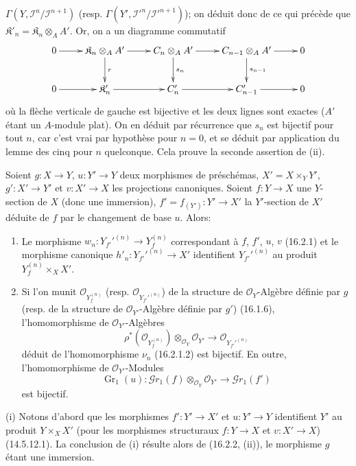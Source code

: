 $\Gamma(Y,\mathscr{I}^n/\mathscr{I}^{n+1})$ (resp.
$\Gamma(Y',\mathscr{I}'^n/\mathscr{I}'^{n+1})$); on déduit donc de ce qui
précède que $\mathfrak{K}'_n=\mathfrak{K}_n\otimes_A A'$. Or, on a un
diagramme commutatif
\[
  \xymatrix{
    0 \ar[r] &
    \mathfrak{K}_n\otimes_A A' \ar[r]\ar[d]^r &
    C_n\otimes_A A' \ar[r]\ar[d]^{s_n} &
    C_{n-1}\otimes_A A' \ar[r]\ar[d]^{s_{n-1}} & 0 \\
    0 \ar[r] &
    \mathfrak{K}'_n \ar[r] &
    C'_n \ar[r] &
    C'_{n-1} \ar[r] & 0
  }
\]
où la flèche verticale de gauche est bijective et les deux lignes sont exactes
($A'$ étant un $A$-module plat). On en déduit par récurrence que $s_n$ est
bijectif pour tout $n$, car c'est vrai par hypothèse pour $n=0$, et se déduit
par application du lemme des cinq pour $n$ quelconque. Cela prouve la seconde
assertion de (ii).

\begin{corollary}[16.2.3]
\label{IV.16.2.3}
Soient $g:X\to Y$, $u:Y'\to Y$ deux morphismes de préschémas,
$X'=X\times_Y Y'$, $g':X'\to Y'$ et $v:X'\to X$ les projections canoniques.
Soient $f:Y\to X$ une $Y$-section de $X$ (donc une immersion),
$f'=f_{(Y')}:Y'\to X'$ la $Y'$-section de $X'$ déduite de $f$ par le
changement de base $u$. Alors:
\begin{enumerate}
\item[(i)] Le morphisme
$w_n:Y_{f'}'^{(n)}\to Y_f^{(n)}$ correspondant à $f$, $f'$, $u$, $v$
(16.2.1) et le morphisme canonique
$h'_n:Y_{f'}'^{(n)}\to X'$ identifient $Y_{f'}'^{(n)}$ au produit
$Y_f^{(n)}\times_X X'$.
\item[(ii)] Si l'on munit $\mathcal{O}_{Y_f^{(n)}}$ (resp.
$\mathcal{O}_{Y_{f'}'^{(n)}}$) de la structure de $\mathcal{O}_Y$-Algèbre
définie par $g$ (resp. de la structure de $\mathcal{O}_{Y'}$-Algèbre définie
par $g'$) (16.1.6), l'homomorphisme de $\mathcal{O}_{Y'}$-Algèbres
\[
  \rho^*(\mathcal{O}_{Y_f^{(n)}})
  \otimes_{\mathcal{O}_Y}\mathcal{O}_{Y'}
  \longrightarrow
  \mathcal{O}_{Y_{f'}'^{(n)}}
  \tag{16.2.3.1}
  \label{IV.16.2.3.1}
\]
déduit de l'homomorphisme $\nu_n$ (16.2.1.2) est bijectif. En outre,
l'homomorphisme de $\mathcal{O}_{Y'}$-Modules
\[
  \operatorname{Gr}_1(u):
  \mathscr{G}r_1(f)\otimes_{\mathcal{O}_Y}\mathcal{O}_{Y'}
  \longrightarrow\mathscr{G}r_1(f')
  \tag{16.2.3.2}
  \label{IV.16.2.3.2}
\]
est bijectif.
\end{enumerate}
\end{corollary}

\noindent(i) Notons d'abord que les morphismes $f':Y'\to X'$ et $u:Y'\to Y$
identifient $Y'$ au produit $Y\times_X X'$ (pour les morphismes structuraux
$f:Y\to X$ et $v:X'\to X$) (14.5.12.1). La conclusion de (i) résulte alors de
(16.2.2, (ii)), le morphisme $g$ étant une immersion.

